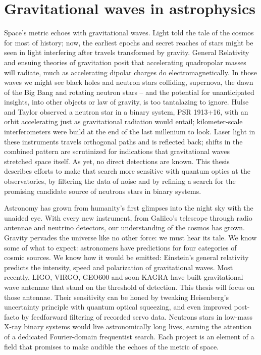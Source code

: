 



    \section{Gravitational waves in astrophysics}
    \label{grav_waves_astro}

        Space's metric echoes with gravitational waves. Light told the tale of the cosmos for most of history; now, the earliest epochs and secret reaches of stars might be seen in light interfering after travels transformed by gravity. General Relativity and ensuing theories of gravitation posit that accelerating quadropolar masses will radiate, much as accelerating dipolar charges do electromagnetically. In those waves we might see black holes and neutron stars colliding, supernova, the dawn of the Big Bang and rotating neutron stars -- and the potential for unanticipated insights, into other objects or law of gravity, is too tantalazing to ignore. Hulse and Taylor observed a neutron star in a binary system, PSR 1913+16, with an orbit accelerating just as gravitational radiation would entail; kilometer-scale interferometers were build at the end of the last millenium to look. Laser light in these instruments travels orthogonal paths and is reflected back; shifts in the combined pattern are scrutinized for indications that gravitational waves stretched space itself. As yet, no direct detections are known. This thesis describes efforts to make that search more sensitive with quantum optics at the observatories, by filtering the data of noise and by refining a search for the promising candidate source of neutrons stars in binary systems.

		Astronomy has grown from humanity's first glimpses into the night sky with the unaided eye. With every new instrument, from Galileo's telescope through radio antennae and neutrino detectors, our understanding of the cosmos has grown. Gravity pervades the universe like no other force: we must hear its tale. We know some of what to expect: astronomers have predictions for four categories of cosmic sources. We know how it would be emitted: Einstein's general relativity predicts the intensity, speed and polarization of gravitational waves. Most recently, LIGO, VIRGO, GEO600 and soon KAGRA have built gravitational wave antennae that stand on the threshold of detection. This thesis will focus on those antennae. Their sensitivity can be honed by tweaking Heisenberg's uncertainty principle with quantum optical squeezing, and even improved post-facto by feedforward filtering of recorded servo data. Neutrons stars in low-mass X-ray binary systems would live astronomically long lives, earning the attention of a dedicated Fourier-domain frequentist search. Each project is an element of a field that promises to make audible the echoes of the metric of space.

